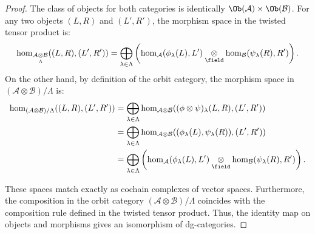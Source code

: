 \begin{proof}
The class of objects for both categories is identically $\Ob(\mathcal{A})\times \Ob(\mathcal{B})$. 
For any two objects $(L,R)$ and $(L',R')$, the morphism space in the twisted tensor product is:
$$
\hom_{\mathcal{A}\underset{\Lambda}{\otimes}\mathcal{B}}((L,R),(L',R'))
=
\bigoplus_{\lambda\in\Lambda}
\left(
\hom_{\mathcal{A}}(\phi_{\lambda}(L),L')
\underset{\field}{\otimes}
\hom_{\mathcal{B}}(\psi_{\lambda}(R),R')
\right).
$$
On the other hand, by definition of the orbit category, the morphism space in $(\mathcal{A}\otimes\mathcal{B})/\Lambda$ is:
\begin{align*}
\hom_{(\mathcal{A}\otimes\mathcal{B})/\Lambda}((L,R),(L',R'))
&=
\bigoplus_{\lambda\in\Lambda}
\hom_{\mathcal{A}\otimes\mathcal{B}}((\phi\otimes\psi)_\lambda(L,R), (L',R'))
\\
&=
\bigoplus_{\lambda\in\Lambda}
\hom_{\mathcal{A}\otimes\mathcal{B}}((\phi_\lambda(L),\psi_\lambda(R)), (L',R'))
\\
&=
\bigoplus_{\lambda\in\Lambda}
\left(
\hom_{\mathcal{A}}(\phi_{\lambda}(L),L')
\underset{\field}{\otimes}
\hom_{\mathcal{B}}(\psi_{\lambda}(R),R')
\right).
\end{align*}

These spaces match exactly as cochain complexes of vector spaces. 
Furthermore, the composition in the orbit category $(\mathcal{A}\otimes\mathcal{B})/\Lambda$ 
coincides with the composition rule defined in the twisted tensor product. Thus, the identity map on objects and morphisms gives an isomorphism of dg-categories.
\end{proof}
